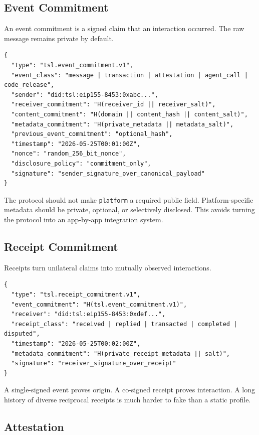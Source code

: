 \documentclass[11pt]{article}
\begin{document}
\subsection{Event Commitment}

An event commitment is a signed claim that an interaction occurred. The raw message remains private by default.

\begin{lstlisting}[style=tslcode]
{
  "type": "tsl.event_commitment.v1",
  "event_class": "message | transaction | attestation | agent_call | code_release",
  "sender": "did:tsl:eip155-8453:0xabc...",
  "receiver_commitment": "H(receiver_id || receiver_salt)",
  "content_commitment": "H(domain || content_hash || content_salt)",
  "metadata_commitment": "H(private_metadata || metadata_salt)",
  "previous_event_commitment": "optional_hash",
  "timestamp": "2026-05-25T00:01:00Z",
  "nonce": "random_256_bit_nonce",
  "disclosure_policy": "commitment_only",
  "signature": "sender_signature_over_canonical_payload"
}
\end{lstlisting}

The protocol should not make \texttt{platform} a required public field. Platform-specific metadata should be private, optional, or selectively disclosed. This avoids turning the protocol into an app-by-app integration system.

\subsection{Receipt Commitment}

Receipts turn unilateral claims into mutually observed interactions.

\begin{lstlisting}[style=tslcode]
{
  "type": "tsl.receipt_commitment.v1",
  "event_commitment": "H(tsl.event_commitment.v1)",
  "receiver": "did:tsl:eip155-8453:0xdef...",
  "receipt_class": "received | replied | transacted | completed | disputed",
  "timestamp": "2026-05-25T00:02:00Z",
  "metadata_commitment": "H(private_receipt_metadata || salt)",
  "signature": "receiver_signature_over_receipt"
}
\end{lstlisting}

A single-signed event proves origin. A co-signed receipt proves interaction. A long history of diverse reciprocal receipts is much harder to fake than a static profile.

\subsection{Attestation}
\end{document}
